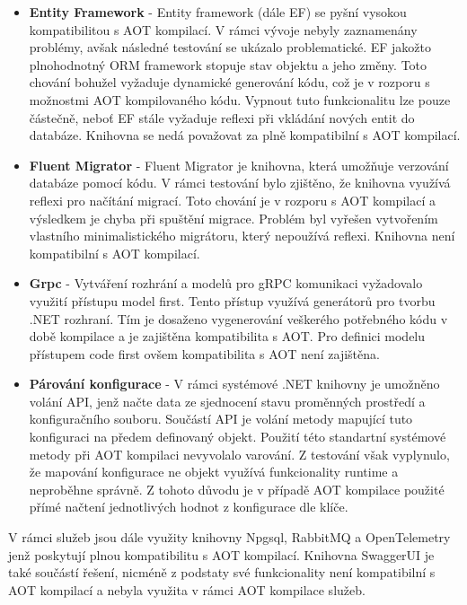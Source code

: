 \begin{itemize}
  \item \textbf{Entity Framework} - Entity framework (dále EF) se pyšní vysokou kompatibilitou s AOT kompilací. V rámci vývoje nebyly zaznamenány problémy, avšak následné testování se ukázalo problematické. EF jakožto plnohodnotný ORM framework stopuje stav objektu a jeho změny. Toto chování bohužel vyžaduje dynamické generování kódu, což je v rozporu s možnostmi AOT kompilovaného kódu. Vypnout tuto funkcionalitu lze pouze částečně, neboť EF stále vyžaduje reflexi při vkládání nových entit do databáze. Knihovna se nedá považovat za plně kompatibilní s AOT kompilací.
  \item \textbf{Fluent Migrator} - Fluent Migrator je knihovna, která umožňuje verzování databáze pomocí kódu. V rámci testování bylo zjištěno, že knihovna využívá reflexi pro načítání migrací. Toto chování je v rozporu s AOT kompilací a výsledkem je chyba při spuštění migrace. Problém byl vyřešen vytvořením vlastního minimalistického migrátoru, který nepoužívá reflexi. Knihovna není kompatibilní s AOT kompilací.
  \item \textbf{Grpc} - Vytváření rozhrání a modelů pro gRPC komunikaci vyžadovalo využití přístupu model first. Tento přístup využívá generátorů pro tvorbu .NET rozhraní. Tím je dosaženo vygenerování veškerého potřebného kódu v době kompilace a je zajištěna kompatibilita s AOT. Pro definici modelu přístupem code first ovšem kompatibilita s AOT není zajištěna.
  \item \textbf{Párování konfigurace} - V rámci systémové .NET knihovny je umožněno volání API, jenž načte data ze sjednocení stavu proměnných prostředí a konfiguračního souboru. Součástí API je volání metody mapující tuto konfiguraci na předem definovaný objekt. Použití této standartní systémové metody při AOT kompilaci nevyvolalo varování. Z testování však vyplynulo, že mapování konfigurace ne objekt využívá funkcionality runtime a neproběhne správně. Z tohoto důvodu je v případě AOT kompilace použité přímé načtení jednotlivých hodnot z konfigurace dle klíče.
\end{itemize}

V rámci služeb jsou dále využity knihovny Npgsql, RabbitMQ a OpenTelemetry jenž poskytují plnou kompatibilitu s AOT kompilací. Knihovna SwaggerUI je také součástí řešení, nicméně z podstaty své funkcionality není kompatibilní s AOT kompilací a nebyla využita v rámci AOT kompilace služeb.


